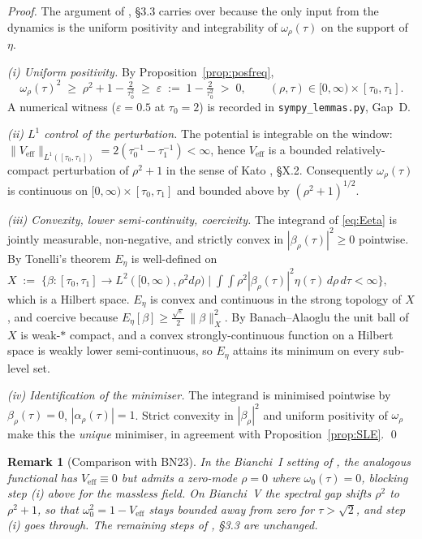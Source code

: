 \documentclass[12pt,letterpaper]{article}
\newtheorem{remark}[theorem]{Remark}
\newcommand{\eps}{\varepsilon}
\begin{document}
\begin{proof}
The argument of \cite{BN23}, \S3.3 carries over because the only
input from the dynamics is the uniform positivity and integrability
of $\omega_{\rho}(\tau)$ on the support of $\eta$.

\emph{(i) Uniform positivity.}  By Proposition~\ref{prop:posfreq},
\[
  \omega_{\rho}(\tau)^{2}\;\ge\;\rho^{2}+1-\tfrac{2}{\tau_{0}^{2}}
  \;\ge\;\eps\;:=\;1-\tfrac{2}{\tau_{0}^{2}}\;>\;0,
  \qquad
  (\rho,\tau)\in[0,\infty)\times[\tau_{0},\tau_{1}].
\]
A numerical witness ($\eps=0.5$ at $\tau_{0}=2$) is recorded in
\texttt{sympy\_lemmas.py}, Gap~D.

\emph{(ii) $L^{1}$ control of the perturbation.}  The potential is
integrable on the window:
$\|V_{\mathrm{eff}}\|_{L^{1}([\tau_{0},\tau_{1}])}
  =2(\tau_{0}^{-1}-\tau_{1}^{-1})<\infty$,
hence $V_{\mathrm{eff}}$ is a bounded relatively-compact perturbation
of $\rho^{2}+1$ in the sense of Kato \cite{ReedSimonII}, \S X.2.
Consequently $\omega_{\rho}(\tau)$ is continuous on
$[0,\infty)\times[\tau_{0},\tau_{1}]$ and bounded above by
$(\rho^{2}+1)^{1/2}$.

\emph{(iii) Convexity, lower semi-continuity, coercivity.}  The
integrand of \eqref{eq:Eeta} is jointly measurable, non-negative, and
strictly convex in $|\beta_{\rho}(\tau)|^{2}\ge 0$ pointwise.  By
Tonelli's theorem $E_{\eta}$ is well-defined on
\(
  X\;:=\;\bigl\{\beta:[\tau_{0},\tau_{1}]\to L^{2}([0,\infty),\rho^{2}d\rho)
  \;\big|\;\int\!\!\int\!\rho^{2}|\beta_{\rho}(\tau)|^{2}\eta(\tau)\,d\rho\,d\tau<\infty\bigr\},
\)
which is a Hilbert space.  $E_{\eta}$ is convex and continuous in the
strong topology of $X$, and coercive because
$E_{\eta}[\beta]\ge \tfrac{\sqrt{\eps}}{2}\,\|\beta\|_{X}^{2}$.
By Banach--Alaoglu the unit ball of $X$ is weak-$*$ compact, and a
convex strongly-continuous function on a Hilbert space is weakly
lower semi-continuous, so $E_{\eta}$ attains its minimum on every
sub-level set.

\emph{(iv) Identification of the minimiser.}  The integrand is
minimised pointwise by $\beta_{\rho}(\tau)=0$, $|\alpha_{\rho}(\tau)|=1$.
Strict convexity in $|\beta_{\rho}|^{2}$ and uniform positivity of
$\omega_{\rho}$ make this the \emph{unique} minimiser, in agreement
with Proposition~\ref{prop:SLE}.
\qed
\end{proof}

\begin{remark}[Comparison with BN23]
\label{rem:BN23compact}
In the Bianchi~I setting of \cite{BN23}, the analogous functional has
$V_{\mathrm{eff}}\equiv 0$ but admits a zero-mode $\rho=0$ where
$\omega_{0}(\tau)=0$, blocking step (i) above for the massless field.
On Bianchi~V the spectral gap shifts $\rho^{2}$ to $\rho^{2}+1$, so
that $\omega_{0}^{2}=1-V_{\mathrm{eff}}$ stays bounded away from zero
for $\tau>\sqrt{2}$, and step (i) goes through.  The remaining steps
of \cite{BN23}, \S3.3 are unchanged.
\end{remark}
\end{document}
